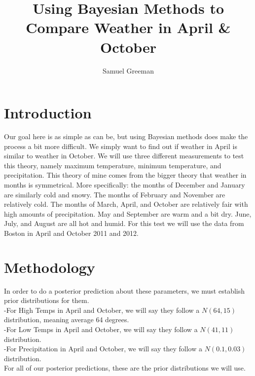\documentclass[12pt]{article}
\title{Using Bayesian Methods to Compare Weather in April \& October}
\author{Samuel Greeman}
\date{}
\begin{document}
\maketitle 
\begin{flushleft}

\setdefaultleftmargin{0pt}{}{}{}{}{}



\section{Introduction}\label{sec:intro}
Our goal here is as simple as can be, but using Bayesian methods does make the process a bit more difficult. We simply want to find out if weather in April is similar to weather in October. We will use three different measurements to test this theory, namely maximum temperature, minimum temperature, and precipitation. This theory of mine comes from the bigger theory that weather in months is symmetrical. More specifically: the months of December and January are similarly cold and snowy. The months of February and November are relatively cold. The months of March, April, and October are relatively fair with high amounts of precipitation. May and September are warm and a bit dry. June, July, and August are all hot and humid. For this test we will use the data from Boston in April and October 2011 and 2012.\\

\section{Methodology}\label{sec:chapter}
In order to do a posterior prediction about these parameters, we must establish prior distributions for them.\\
-For High Temps in April and October, we will say they follow a \(N(64, 15)\) distribution, meaning average 64 degrees.\\
-For Low Temps in April and October, we will say they follow a \(N(41, 11)\) distribution.\\
-For Precipitation in April and October, we will say they follow a \(N(0.1, 0.03)\) distribution.\\
For all of our posterior predictions, these are the prior distributions we will use.\\


\end{flushleft}
\end{document}
